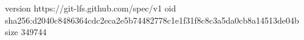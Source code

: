 version https://git-lfs.github.com/spec/v1
oid sha256:d2040c8486364cdc2eca2e5b74482778c1e1f31f8c8c3a5da0cb8a14513de04b
size 349744
